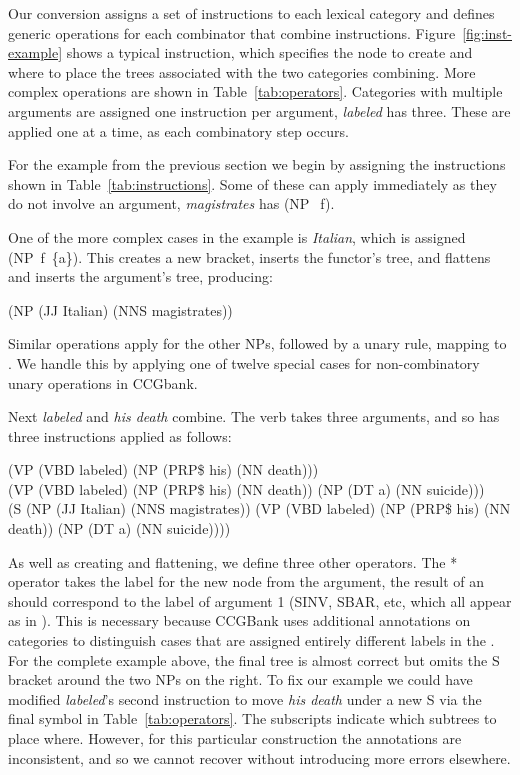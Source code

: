 Our conversion assigns a set of instructions to each lexical category and
defines generic operations for each combinator that combine instructions.
Figure~\ref{fig:inst-example} shows a typical instruction, which specifies the
node to create and where to place the \ptb trees associated with the two
categories combining.  More complex operations are shown in
Table~\ref{tab:operators}.  Categories with multiple arguments are assigned one
instruction per argument, \myeg \textit{labeled} has three.  These are applied
one at a time, as each combinatory step occurs.

For the example from the previous section we begin by assigning the
instructions shown in Table~\ref{tab:instructions}.  Some of these can apply
immediately as they do not involve an argument, \myeg \textit{magistrates} has (NP$\;$~f).

One of the more complex cases in the example is \textit{Italian}, which is
assigned (NP~f~\{a\}). This creates a new bracket, inserts the functor's tree, and
flattens and inserts the argument's tree, producing:

\vspace{3mm}
\noindent
(NP (JJ Italian) (NNS magistrates))
\vspace{3mm}

Similar operations apply for the other NPs, followed by a unary rule,
mapping  to .  We handle this by applying one of twelve special
cases for non-combinatory unary operations in CCGbank.

Next \textit{labeled} and \textit{his death} combine.  The verb takes three
arguments, and so has three instructions applied as follows:

\vspace{3mm}
\noindent
(VP (VBD labeled) (NP (PRP\$ his) (NN death))) \\
(VP (VBD labeled) (NP (PRP\$ his) (NN death)) (NP (DT a) (NN suicide))) \\
(S (NP (JJ Italian) (NNS magistrates)) (VP (VBD labeled) (NP (PRP\$ his) (NN death)) (NP (DT a) (NN suicide))))
\vspace{3mm}

As well as creating and flattening, we define three other operators.
The * operator takes the label for the new node from the argument,
\myeg the result of an  should correspond to the label of
argument 1 (SINV, SBAR, etc, which all appear as  in \ccg).
This is necessary because CCGBank uses additional annotations on categories to distinguish cases that are assigned entirely different labels in the \ptb.
For the complete example above, the final tree is almost correct but omits the S bracket around the two NPs on the right.
To fix our example we could have modified \textit{labeled}'s second instruction to move \textit{his death} under a new S via the final symbol in Table~\ref{tab:operators}.
The subscripts indicate which subtrees to place where.
However, for this particular construction the \ptb annotations are inconsistent, and so we cannot recover without introducing more errors elsewhere.

